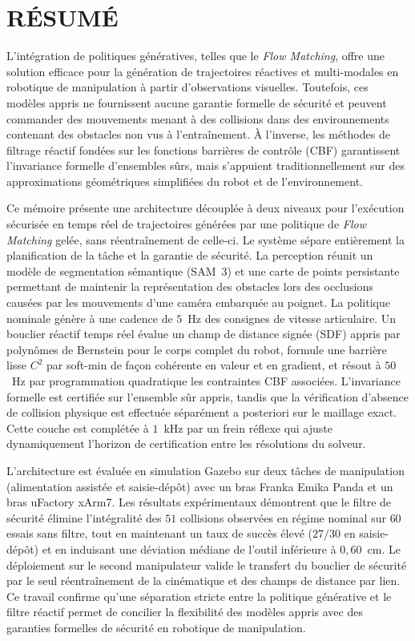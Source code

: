 %
\chapter*{RÉSUMÉ}\thispagestyle{headings}

L'intégration de politiques génératives, telles que le \textit{Flow Matching}, offre une solution efficace pour la génération de trajectoires réactives et multi-modales en robotique de manipulation à partir d'observations visuelles. Toutefois, ces modèles appris ne fournissent aucune garantie formelle de sécurité et peuvent commander des mouvements menant à des collisions dans des environnements contenant des obstacles non vus à l'entraînement. À l'inverse, les méthodes de filtrage réactif fondées sur les fonctions barrières de contrôle (\ac{CBF}) garantissent l'invariance formelle d'ensembles sûrs, mais s'appuient traditionnellement sur des approximations géométriques simplifiées du robot et de l'environnement.

Ce mémoire présente une architecture découplée à deux niveaux pour l'exécution sécurisée en temps réel de trajectoires générées par une politique de \textit{Flow Matching} gelée, sans réentraînement de celle-ci. Le système sépare entièrement la planification de la tâche et la garantie de sécurité. La perception réunit un modèle de segmentation sémantique (\ac{SAM}~3) et une carte de points persistante permettant de maintenir la représentation des obstacles lors des occlusions causées par les mouvements d'une caméra embarquée au poignet. La politique nominale génère à une cadence de $5$~Hz des consignes de vitesse articulaire. Un bouclier réactif temps réel évalue un champ de distance signée (\ac{SDF}) appris par polynômes de Bernstein pour le corps complet du robot, formule une barrière lisse $C^2$ par soft-min de façon cohérente en valeur et en gradient, et résout à $50$~Hz par programmation quadratique les contraintes \ac{CBF} associées. L'invariance formelle est certifiée sur l'ensemble sûr appris, tandis que la vérification d'absence de collision physique est effectuée séparément a posteriori sur le maillage exact. Cette couche est complétée à $1$~kHz par un frein réflexe qui ajuste dynamiquement l'horizon de certification entre les résolutions du solveur.

L'architecture est évaluée en simulation Gazebo sur deux tâches de manipulation (alimentation assistée et saisie-dépôt) avec un bras Franka Emika Panda et un bras uFactory xArm7. Les résultats expérimentaux démontrent que le filtre de sécurité élimine l'intégralité des $51$ collisions observées en régime nominal sur $60$ essais sans filtre, tout en maintenant un taux de succès élevé ($27/30$ en saisie-dépôt) et en induisant une déviation médiane de l'outil inférieure à $0{,}60$~cm. Le déploiement sur le second manipulateur valide le transfert du bouclier de sécurité par le seul réentraînement de la cinématique et des champs de distance par lien. Ce travail confirme qu'une séparation stricte entre la politique générative et le filtre réactif permet de concilier la flexibilité des modèles appris avec des garanties formelles de sécurité en robotique de manipulation.
